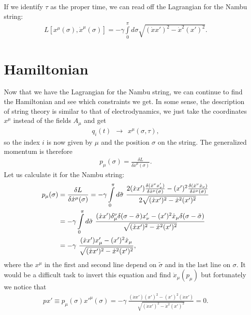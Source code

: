 If we identify $\tau$ as the proper time, we can read off the Lagrangian for the Nambu string:
\begin{align}
L[x^{\mu}(\sigma), \dot{x}^{\mu}(\sigma)] = - \gamma \displaystyle\int\limits_{0}^{\pi} d\sigma \sqrt{(\dot{x}x')^2 - \dot{x}^2(x')^2}.
\end{align}




\section{Hamiltonian}

Now that we have the Lagrangian for the Nambu string, we can continue to find the Hamiltonian and see which constraints we get. In some sense, the description of string theory is similar to that of electrodynamics, we just take the coordinates $x^{\mu}$ instead of the fields $A_{\mu}$ and get
\begin{align}
q_i(t) \ \ \longrightarrow \ \ x^{\mu}(\sigma, \tau),
\end{align}
so the index $i$ is now given by $\mu$ and the position $\sigma$ on the string. The generalized momentum is therefore
\begin{align}
p_{\mu}(\sigma) = \frac{\delta L}{\delta \dot{x}^{\mu}(\sigma)}.
\end{align}
Let us calculate it for the Nambu string:
\begin{align}
p_{\mu}(\sigma) &= \frac{\delta L}{\delta \dot{x}^{\mu}(\sigma)} =  - \gamma \displaystyle\int\limits_{0}^{\pi} d\tilde{\sigma} \ \frac{2 (\dot{x}x') \frac{\delta(\dot{x}^{\nu}x'_{\nu})}{\delta \dot{x}^{\mu}(\sigma)} - (x')^2 \frac{\delta (\dot{x}^{\nu}\dot{x}_{\nu})}{\delta \dot{x}^{\mu}(\sigma)}}{2 \sqrt{(\dot{x}x')^2 - \dot{x}^2(x')^2}} \notag \\
&= - \gamma \displaystyle\int\limits_{0}^{\pi} d\tilde{\sigma} \ \frac{(\dot{x}x') \delta_{\mu}^{\nu} \delta(\sigma - \tilde{\sigma}) x'_{\nu} - (x')^2 \dot{x}_{\mu} \delta(\sigma - \tilde{\sigma})}{\sqrt{(\dot{x}x')^2 - \dot{x}^2(x')^2}} \notag \\
&= - \gamma \ \frac{(\dot{x}x') x'_{\mu} - (x')^2 \dot{x}_{\mu}}{\sqrt{(\dot{x}x')^2 - \dot{x}^2(x')^2}},
\end{align}
where the $x^{\mu}$ in the first and second line depend on $\tilde{\sigma}$ and in the last line on $\sigma$. It would be a difficult task to invert this equation and find $\dot{x}_{\mu}(p_{\mu})$ but fortunately we notice that
\begin{align}
px' \equiv p_{\mu}(\sigma) x'^{\mu}(\sigma) = - \gamma \ \frac{(\dot{x}x') (x')^2 - (x')^2 (\dot{x}x')}{\sqrt{(\dot{x}x')^2 - \dot{x}^2(x')^2}} = 0.
\end{align}


